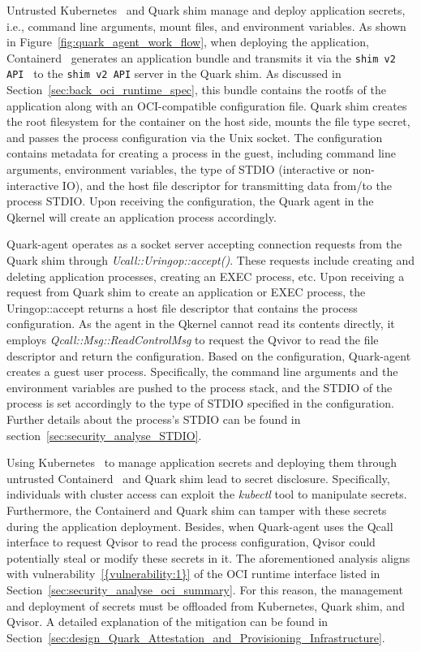 Untrusted Kubernetes~\cite*{k8s} and Quark shim manage and deploy application secrets, i.e., command line arguments, mount files, and environment variables. As shown in Figure~\ref{fig:quark_agent_work_flow}, when deploying the application, Containerd~\cite*{containerd} generates an application bundle and transmits it via the \texttt{shim v2 API}~\cite*{shim_v2} to the \texttt{shim v2 API} server in the Quark shim. 
As discussed in Section~\ref{sec:back_oci_runtime_spec}, this bundle contains the rootfs of the application along with an OCI-compatible configuration file. Quark shim creates the root filesystem for the container on the host side, mounts the file type secret, and passes the process configuration via the Unix socket. The configuration contains metadata for creating a process in the guest, including command line 
arguments, environment variables, the type of STDIO (interactive or non-interactive IO), and the host file descriptor for transmitting data from/to the process STDIO. Upon receiving the configuration, the Quark agent in the Qkernel will create an application process accordingly.


Quark-agent operates as a socket server accepting connection requests from the Quark shim through \emph{Ucall::Uringop::accept()}. These requests include creating and deleting application processes, creating an EXEC process, etc. Upon receiving a request from Quark shim to create an application or EXEC process, the Uringop::accept returns a host file descriptor 
that contains the process configuration. As the agent in the Qkernel cannot read its contents directly, it employs \emph{Qcall::Msg::ReadControlMsg} to request the Qvivor to read the file descriptor and return the configuration. Based on the configuration, Quark-agent creates a guest user process. Specifically, the command line arguments and the environment variables 
are pushed to the process stack, and the STDIO of the process is set accordingly to the type of STDIO specified in the configuration. Further details about the process's STDIO can be found in section~\ref{sec:security_analyse_STDIO}.


Using Kubernetes~\cite*{k8s} to manage application secrets and deploying them through untrusted Containerd~\cite*{containerd} and Quark shim lead to secret disclosure. Specifically, individuals with cluster access can exploit the \emph{kubectl} tool to manipulate secrets. Furthermore, the Containerd and Quark shim can tamper with these secrets during the application deployment. Besides, 
when Quark-agent uses the Qcall interface to request Qvisor to read the process configuration, Qvisor could potentially steal or modify these secrets in it.  The aforementioned analysis aligns with vulnerability~\ref{{vulnerability:1}} of the OCI runtime interface listed in Section~\ref{sec:security_analyse_oci_summary}. For this reason, the management and deployment of secrets must be offloaded from Kubernetes, Quark shim, 
and Qvisor. A detailed explanation of the mitigation can be found in Section~\ref{sec:design_Quark_Attestation_and_Provisioning_Infrastructure}.


